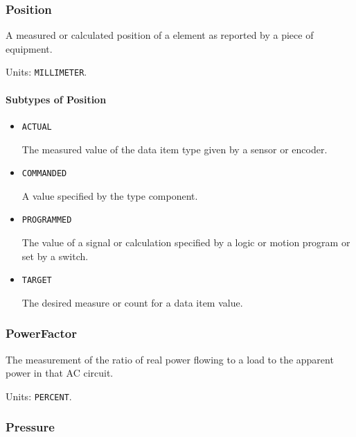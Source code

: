 \subsubsection{Position}
\label{sec:Position}



A measured or calculated position of a  element as reported by a piece of equipment.


Units: \texttt{MILLIMETER}.

\paragraph{Subtypes of Position}\mbox{}
\label{sec:Subtypes of Position}

\begin{itemize}

\item \texttt{ACTUAL}


The measured value of the data item type given by a sensor or encoder.

\item \texttt{COMMANDED}


A value specified by the  type component.

\item \texttt{PROGRAMMED}


The value of a signal or calculation specified by a logic or motion program or set by a switch.

\item \texttt{TARGET}


The desired measure or count for a data item value.


\end{itemize}

\subsubsection{PowerFactor}
\label{sec:PowerFactor}



The measurement of the ratio of real power flowing to a load to the apparent power in that AC circuit.


Units: \texttt{PERCENT}.

\subsubsection{Pressure}
\label{sec:Pressure}



